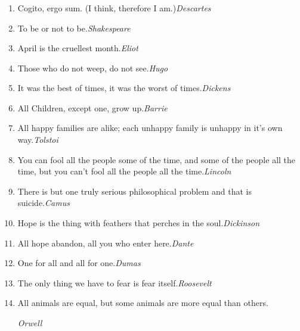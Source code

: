 \documentclass[UTF8,aspectratio=43,11pt,colorlinks,compress,openany]{beamer}%
\begin{document}
\begin{frame}\frametitle{}
\begin{enumerate}
\item Cogito, ergo sum. (I think, therefore I am.)\hfill \textsl{Descartes}
\item To be or not to be.\hfill \textsl{Shakespeare}
\item April is the cruellest month.\hfill \textsl{Eliot}
\item Those who do not weep, do not see.\hfill \textsl{Hugo}
\item It was the best of times, it was the worst of times.\hfill \textsl{Dickens}
\item All Children, except one, grow up.\hfill \textsl{Barrie}
\item All happy families are alike; each unhappy family is unhappy in it's own way.\hfill \textsl{Tolstoi}
\item You can fool all the people some of the time, and some of the people all the time, but you can't fool all the people all the time.\hfill \textsl{Lincoln}
\item There is but one truly serious philosophical problem and that is suicide.\hfill \textsl{Camus}
\item Hope is the thing with feathers that perches in the soul.\hfill \textsl{Dickinson}
\item All hope abandon, all you who enter here.\hfill \textsl{Dante}
\item One for all and all for one.\hfill \textsl{Dumas}
\item The only thing we have to fear is fear itself.\hfill \textsl{Roosevelt}
\item All animals are equal, but some animals are more equal than others.\par\hfill \textsl{Orwell}
\end{enumerate}
\end{frame}
\end{document}
